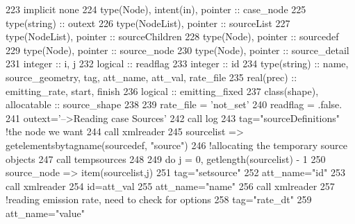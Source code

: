 \begin{DoxyCode}
223     \textcolor{keywordtype}{implicit none}
224     \textcolor{keywordtype}{type}(Node), \textcolor{keywordtype}{intent(in)}, \textcolor{keywordtype}{pointer} :: case\_node
225     \textcolor{keywordtype}{type}(string) :: outext
226     \textcolor{keywordtype}{type}(NodeList), \textcolor{keywordtype}{pointer} :: sourceList
227     \textcolor{keywordtype}{type}(NodeList), \textcolor{keywordtype}{pointer} :: sourceChildren
228     \textcolor{keywordtype}{type}(Node), \textcolor{keywordtype}{pointer} :: sourcedef
229     \textcolor{keywordtype}{type}(Node), \textcolor{keywordtype}{pointer} :: source\_node
230     \textcolor{keywordtype}{type}(Node), \textcolor{keywordtype}{pointer} :: source\_detail
231     \textcolor{keywordtype}{integer} :: i, j
232     \textcolor{keywordtype}{logical} :: readflag
233     \textcolor{keywordtype}{integer} :: id
234     \textcolor{keywordtype}{type}(string) :: name, source\_geometry, tag, att\_name, att\_val, rate\_file
235     \textcolor{keywordtype}{real(prec)} :: emitting\_rate, start, finish
236     \textcolor{keywordtype}{logical} :: emitting\_fixed
237     \textcolor{keywordtype}{class}(shape), \textcolor{keywordtype}{allocatable} :: source\_shape
238 
239     rate\_file = \textcolor{stringliteral}{'not\_set'}
240     readflag = .false.
241     outext=\textcolor{stringliteral}{'-->Reading case Sources'}
242     \textcolor{keyword}{call }log%
243     tag=\textcolor{stringliteral}{"sourceDefinitions"}    \textcolor{comment}{!the node we want}
244     \textcolor{keyword}{call }xmlreader%
245     sourcelist => getelementsbytagname(sourcedef, \textcolor{stringliteral}{"source"})
246     \textcolor{comment}{!allocating the temporary source objects}
247     \textcolor{keyword}{call }tempsources%
248 
249     \textcolor{keywordflow}{do} j = 0, getlength(sourcelist) - 1
250         source\_node => item(sourcelist,j)
251         tag=\textcolor{stringliteral}{"setsource"}
252         att\_name=\textcolor{stringliteral}{"id"}
253         \textcolor{keyword}{call }xmlreader%
254         id=att\_val%
255         att\_name=\textcolor{stringliteral}{"name"}
256         \textcolor{keyword}{call }xmlreader%
257         \textcolor{comment}{!reading emission rate, need to check for options}
258         tag=\textcolor{stringliteral}{"rate\_dt"}
259         att\_name=\textcolor{stringliteral}{"value"}

\end{DoxyCode}
